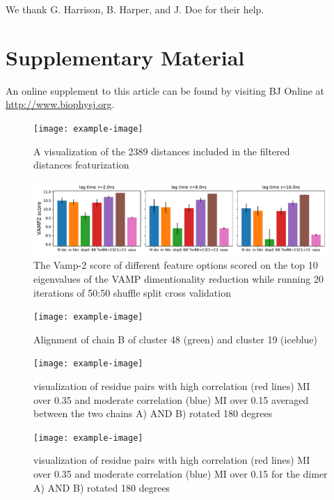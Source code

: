 \documentclass{biophys-new}
\begin{document}
We thank G. Harrison, B. Harper, and J. Doe for their help.




\section*{Supplementary Material}

An online supplement to this article can be found by visiting BJ Online at \url{http://www.biophysj.org}.

\begin{figure}[ht]
\centering
\graphicspath{ {./images/} }
\texttt{[image: example-image]}
\caption{A visualization of the 2389 distances included in the filtered distances featurization}
\label{fig:view}
\end{figure}

\begin{figure}[h]
\centering
\graphicspath{ {./supplemental_figures/} }
\includegraphics[width=0.6\linewidth]{sup_fig_2vamp_score_10dim_20splits_both_3_zoom.pdf}
\caption{The Vamp-2 score of different feature options scored on the top 10 eigenvalues of the VAMP dimentionality reduction while running 20 iterations of 50:50 shuffle split cross validation}
\label{fig:view}
\end{figure}

\begin{figure}[alignment-linker-helix]
\centering
\texttt{[image: example-image]}
\caption{Alignment of chain B of cluster 48 (green) and cluster 19 (iceblue)}
\label{fig:view}
\end{figure}

\begin{figure}[mutual-information-average]
\centering
\texttt{[image: example-image]}
\caption{visualization of residue pairs with high correlation (red lines) MI over 0.35 and moderate correlation (blue) MI over 0.15 averaged between the two chains A) AND B) rotated 180 degrees}
\label{fig:view}
\end{figure}

\begin{figure}[mutual-information-average]
\centering
\texttt{[image: example-image]}
\caption{visualization of residue pairs with high correlation (red lines) MI over 0.35 and moderate correlation (blue) MI over 0.15 for the dimer A) AND B) rotated 180 degrees}
\label{fig:view}
\end{figure}
\end{document}
